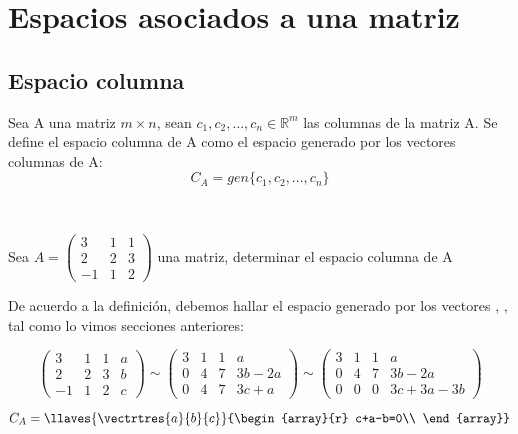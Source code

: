\chapter{Espacios asociados a una matriz}

\section{Espacio columna}
\begin{dfn}
Sea A una matriz $m\times n$, sean $c_1,c_2,\ldots, c_n \in \mathbb{R}^m$ las columnas de la matriz A. Se define el espacio columna de A como el espacio generado por los vectores columnas de A:
~\\
\[C_A=gen\{c_1, c_2, ..., c_n\}\]
\end{dfn}
~\\

\begin{ejemplo}
Sea $A=
\left(
\begin{array}{rrr}
3&1&1\\
2&2&3\\
-1&1&2
\end{array}
\right)$ una matriz, determinar el espacio columna de A
 
De acuerdo a la definición, debemos hallar el espacio generado por los vectores , ,  tal como lo vimos secciones anteriores:

\[
\left(
\begin{array}{rrr|r}
3&1&1&a\\
2&2&3&b\\
-1&1&2&c
\end{array}
\right)
\sim
\left(
\begin{array}{rrr|r}
3&1&1&a\\
0&4&7&3b-2a\\
0&4&7&3c+a
\end{array}
\right)
\sim
\left(
\begin{array}{rrr|r}
3&1&1&a\\
0&4&7&3b-2a\\
0&0&0&3c+3a-3b
\end{array}
\right)
\]

\[C_A=\llaves{\vectrtres{a}{b}{c}}
{\begin{array}{r}
c+a-b=0\\
\end{array}}
\]

\end{ejemplo}

